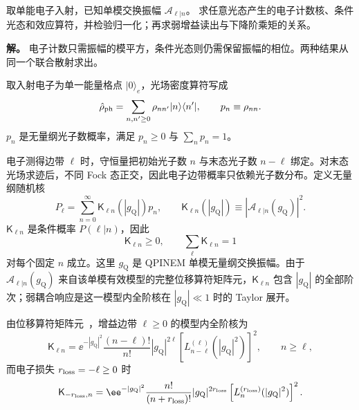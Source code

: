 \begin{exbox}
取单能电子入射，已知单模交换振幅 $\mathcal A_{\ell|n}$。
求任意光态产生的电子计数核、条件光态和效应算符，并检验归一化；再求弱增益读出与下降阶乘矩的关系。

\textbf{解。}
电子计数只需振幅的模平方，条件光态则仍需保留振幅的相位。两种结果从同一个联合散射求出。

取入射电子为单一能量格点 $|0\rangle_e$，光场密度算符写成
\begin{equation*}
\hat\rho_{\rm ph}
=\sum_{n,n'\ge0}\rho_{nn'}|n\rangle\langle n'|,
\qquad
p_n\equiv\rho_{nn}.
\end{equation*}
$p_n$ 是无量纲光子数概率，满足 $p_n\ge0$ 与 $\sum_n p_n=1$。

电子测得边带 $\ell$ 时，守恒量把初始光子数 $n$ 与末态光子数 $n-\ell$ 绑定。对末态光场求迹后，不同 Fock 态正交，因此电子边带概率只依赖光子数分布。定义无量纲随机核
\begin{equation}
{
P_\ell
=\sum_{n=0}^{\infty}\mathsf K_{\ell n}(|g_{\mathrm Q}|)p_n,
\qquad
\mathsf K_{\ell n}(|g_{\mathrm Q}|)
\equiv|\mathcal A_{\ell|n}(g_{\mathrm Q})|^2.}
\label{eq:electron_spectrum_linear_kernel}
\end{equation}
$\mathsf K_{\ell n}$ 是条件概率 $P(\ell|n)$，因此
\begin{equation*}
\mathsf K_{\ell n}\ge0,
\qquad
\sum_\ell\mathsf K_{\ell n}=1
\end{equation*}
对每个固定 $n$ 成立。这里 $g_{\mathrm Q}$ 是 QPINEM 单模无量纲交换振幅。由于 $\mathcal A_{\ell|n}(g_{\mathrm Q})$ 来自该单模有效模型的完整位移算符矩阵元，$\mathsf K_{\ell n}$ 包含 $|g_{\mathrm Q}|$ 的全部阶次；弱耦合响应是这一模型内全阶核在 $|g_{\mathrm Q}|\ll1$ 时的 Taylor 展开。

由位移算符矩阵元~，增益边带 $\ell\ge0$ 的模型内全阶核为
\begin{equation}
{
\mathsf K_{\ell n}
=\ee^{-|g_{\mathrm Q}|^2}\frac{(n-\ell)!}{n!}|g_{\mathrm Q}|^{2\ell}
\left[L_{n-\ell}^{(\ell)}(|g_{\mathrm Q}|^2)\right]^2,
\qquad n\ge\ell,}
\label{eq:kernel_gain}
\end{equation}
而电子损失 $r_{\rm loss}=-\ell\ge0$ 时
\begin{equation}
{
\mathsf K_{-r_{\rm loss},n}
=\ee^{-|g_{\mathrm Q}|^2}\frac{n!}{(n+r_{\rm loss})!}|g_{\mathrm Q}|^{2r_{\rm loss}}
\left[L_n^{(r_{\rm loss})}(|g_{\mathrm Q}|^2)\right]^2.}
\label{eq:kernel_loss}
\end{equation}


\end{exbox}
